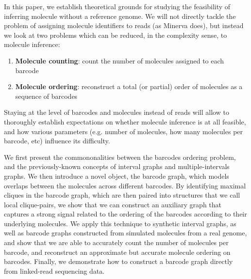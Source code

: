 \documentclass[a4paper,UKenglish,cleveref, autoref, thm-restate,authorcolumns]{lipics-v2019}
\begin{document}
In this paper, we establish theoretical grounds for studying the feasibility of inferring molecule without a reference genome. %
We will not directly tackle the problem of assigning molecule identifiers to reads (as Minerva does), but instead we look at two problems which can be reduced, in the complexity sense, to molecule inference: %
\begin{enumerate}
    \item \textbf{Molecule counting}: count the number of molecules assigned to each barcode
    \item \textbf{Molecule ordering}: reconstruct a total (or partial) order of molecules as a sequence of barcodes
\end{enumerate}
Staying at the level of barcodes and molecules instead of reads will allow to thoroughly establish expectations on whether molecule inference is at all feasible, %
and how various parameters (e.g. number of molecules, how many molecules per barcode, etc) influence its difficulty. 

We first present the commononalities between the barcodes ordering problem, and the previously-known concepts of interval graphs and multiple-intervals graphs. We then introduce a novel object, the barcode graph, which models overlaps between  the molecules across different barcodes.
By identifying maximal cliques in the barcode graph, which are then paired into structures that we call local clique-pairs, we show that we can construct an auxiliary graph %
that captures a strong signal related to the ordering of the barcodes according to their underlying molecules.
We apply this technique to synthetic interval graphs, as well as barcode graphs constructed from simulated molecules from a real genome, and show that we are able to accurately count the number of molecules per barcode, and reconstruct an approximate but accurate molecule ordering on barcodes. Finally, we demonstrate how to construct a barcode graph directly from linked-read sequencing data.


\end{document}
